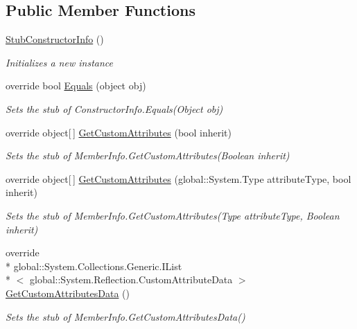 \subsection*{Public Member Functions}
\begin{DoxyCompactItemize}
\item 
\hyperlink{class_system_1_1_reflection_1_1_fakes_1_1_stub_constructor_info_a1c918fa29eb10875ed88e172533f2214}{Stub\-Constructor\-Info} ()
\begin{DoxyCompactList}\small\item\em Initializes a new instance\end{DoxyCompactList}\item 
override bool \hyperlink{class_system_1_1_reflection_1_1_fakes_1_1_stub_constructor_info_a1eb209ceaf95ce31677a9b150b8381a3}{Equals} (object obj)
\begin{DoxyCompactList}\small\item\em Sets the stub of Constructor\-Info.\-Equals(\-Object obj)\end{DoxyCompactList}\item 
override object\mbox{[}$\,$\mbox{]} \hyperlink{class_system_1_1_reflection_1_1_fakes_1_1_stub_constructor_info_abd399c576f9bb5e8b3b6937aebbebf1b}{Get\-Custom\-Attributes} (bool inherit)
\begin{DoxyCompactList}\small\item\em Sets the stub of Member\-Info.\-Get\-Custom\-Attributes(\-Boolean inherit)\end{DoxyCompactList}\item 
override object\mbox{[}$\,$\mbox{]} \hyperlink{class_system_1_1_reflection_1_1_fakes_1_1_stub_constructor_info_ac385ef7859a4c142b41c8a1ddf2d51f4}{Get\-Custom\-Attributes} (global\-::\-System.\-Type attribute\-Type, bool inherit)
\begin{DoxyCompactList}\small\item\em Sets the stub of Member\-Info.\-Get\-Custom\-Attributes(\-Type attribute\-Type, Boolean inherit)\end{DoxyCompactList}\item 
override \\*
global\-::\-System.\-Collections.\-Generic.\-I\-List\\*
$<$ global\-::\-System.\-Reflection.\-Custom\-Attribute\-Data $>$ \hyperlink{class_system_1_1_reflection_1_1_fakes_1_1_stub_constructor_info_a5a9a2d70a1d8b4a858936310f1ef4294}{Get\-Custom\-Attributes\-Data} ()
\begin{DoxyCompactList}\small\item\em Sets the stub of Member\-Info.\-Get\-Custom\-Attributes\-Data()\end{DoxyCompactList}\item 

\end{DoxyCompactItemize}
